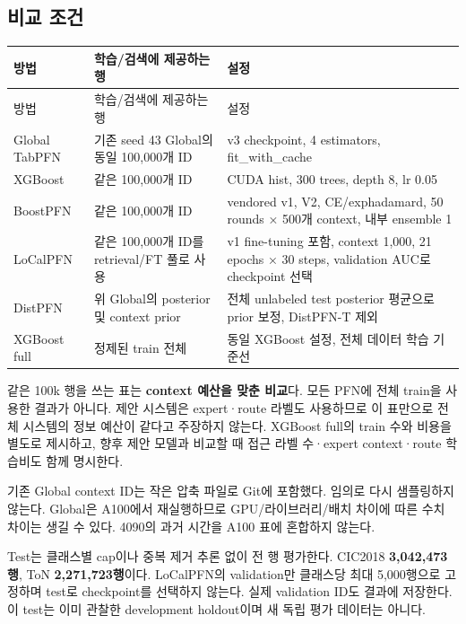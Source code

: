 \subsection{비교 조건}
\begingroup
\footnotesize
\begin{longtable}{>{\raggedright\arraybackslash}p{}>{\raggedright\arraybackslash}p{}>{\raggedright\arraybackslash}p{}}
\toprule
방법 & 학습/\allowbreak{}검색에 제공하는 행 & 설정 \\ \midrule
\endfirsthead
방법 & 학습/\allowbreak{}검색에 제공하는 행 & 설정 \\ \midrule
\endhead
{}Global TabPFN & 기존 seed 43 Global의 동일 100,000개 ID & v3 checkpoint, 4 estimators, fit\_\allowbreak{}with\_\allowbreak{}cache \\
{}XGBoost & 같은 100,000개 ID & CUDA hist, 300 trees, depth 8, lr 0.05 \\
{}BoostPFN & 같은 100,000개 ID & vendored v1, V2, CE/\allowbreak{}exphadamard, 50 rounds × 500개 context, 내부 ensemble 1 \\
{}LoCalPFN & 같은 100,000개 ID를 retrieval/\allowbreak{}FT 풀로 사용 & v1 fine-tuning 포함, context 1,000, 21 epochs × 30 steps, validation AUC로 checkpoint 선택 \\
{}DistPFN & 위 Global의 posterior 및 context prior & 전체 unlabeled test posterior 평균으로 prior 보정, DistPFN-T 제외 \\
{}XGBoost full & 정제된 train 전체 & 동일 XGBoost 설정, 전체 데이터 학습 기준선 \\
\bottomrule
\end{longtable}
\endgroup
같은 100k 행을 쓰는 표는 \textbf{context 예산을 맞춘 비교}다. 모든 PFN에 전체 train을 사용한 결과가 아니다. 제안 시스템은 expert·route 라벨도 사용하므로 이 표만으로 전체 시스템의 정보 예산이 같다고 주장하지 않는다. XGBoost full의 train 수와 비용을 별도로 제시하고, 향후 제안 모델과 비교할 때 접근 라벨 수·expert context·route 학습비도 함께 명시한다.

기존 Global context ID는 작은 압축 파일로 Git에 포함했다. 임의로 다시 샘플링하지 않는다. Global은 A100에서 재실행하므로 GPU/\allowbreak{}라이브러리/\allowbreak{}배치 차이에 따른 수치 차이는 생길 수 있다. 4090의 과거 시간을 A100 표에 혼합하지 않는다.

Test는 클래스별 cap이나 중복 제거 추론 없이 전 행 평가한다. CIC2018 \textbf{3,042,473행}, ToN \textbf{2,271,723행}이다. LoCalPFN의 validation만 클래스당 최대 5,000행으로 고정하며 test로 checkpoint를 선택하지 않는다. 실제 validation ID도 결과에 저장한다. 이 test는 이미 관찰한 development holdout이며 새 독립 평가 데이터는 아니다.

